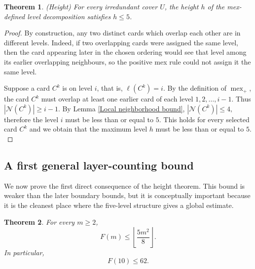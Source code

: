 \documentclass[11pt]{article}
\newtheorem{theorem}{Theorem}[section]
\DeclareMathOperator{\mex}{mex}
\begin{document}
	
	
	\begin{theorem}(Height)
		For every irredundant cover \(U\), the height \(h\) of the mex-defined level decomposition satisfies \(h\le5\).
	\end{theorem}
	
	\begin{proof}
		By construction, any two distinct cards which overlap each other are in different levels. Indeed, if two overlapping cards were assigned the same level, then the card appearing later in the chosen ordering would see that level among its earlier overlapping neighbours, so the positive mex rule could not assign it the same level. 
		
		Suppose a card \(C^k\) is on level \(i\), that is, \(\ell(C^k)=i\). By the definition of \(\mex_+\), the card \(C^k\) must overlap at least one earlier card of each level $1,2,\ldots,i-1.$ Thus $|\mathcal N(C^k)|\ge i-1.$ By Lemma \ref{Local neighborhood bound}, $|\mathcal N(C^k)|\le4,$
		therefore the level $i$ must be less than or equal to $5.$ This holds for every selected card \(C^k\) and we obtain that the maximum level $h$ must be less than or equal to $5.$
	\end{proof}
	
	\subsection{A first general layer-counting bound}
	
	\label{section_6}
	We now prove the first direct consequence of the height theorem. This bound is weaker than the later boundary bounds, but it is conceptually important because it is the cleanest place where the five-level structure gives a global estimate.
	
	\begin{theorem}
		For every \(m\ge2\),
		\[
		{
			F(m)\le \left\lfloor \frac{5m^2}{8}\right\rfloor.
		}
		\]
		In particular,
		\[
		F(10)\le62.
		\]
	\end{theorem}
	
\end{document}
